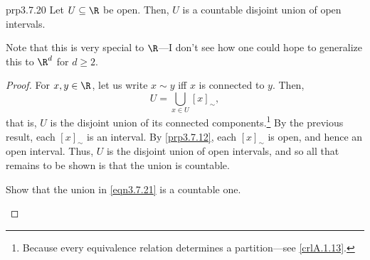 \begin{thm}{}{prp3.7.20}
Let $U\subseteq \R$ be open.  Then, $U$ is a countable disjoint union of open intervals.
\begin{rmk}
Note that this is very special to $\R$---I don't see how one could hope to generalize this to $\R ^d$ for $d\geq 2$.
\end{rmk}
\begin{proof}
For $x,y\in \R$, let us write $x\sim y$ iff $x$ is connected to $y$.  Then,
\begin{equation}\label{eqn3.7.21}
U=\bigcup _{x\in U}[x]_{\sim},
\end{equation}
that is, $U$ is the disjoint union of its connected components.\footnote{Because every equivalence relation determines a partition---see \cref{crlA.1.13}.}  By the previous result, each $[x]_{\sim}$ is an interval.  By \cref{prp3.7.12}, each $[x]_{\sim}$ is open, and hence an open interval.  Thus, $U$ is the disjoint union of open intervals, and so all that remains to be shown is that the union is countable.
\begin{exr}{}{}
Show that the union in \eqref{eqn3.7.21} is a countable one.
\end{exr}
\end{proof}
\end{thm}

